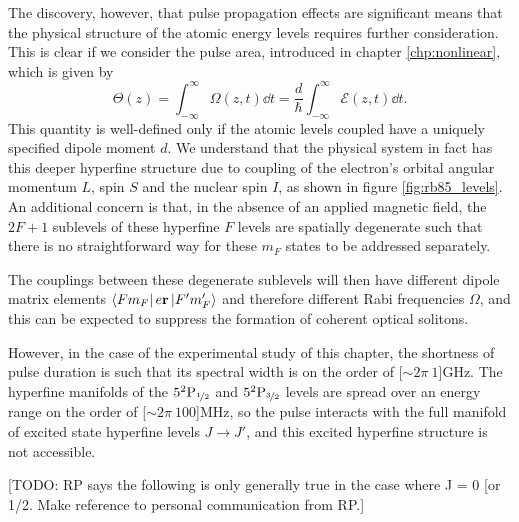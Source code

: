     The discovery, however, that pulse propagation effects are significant means
    that the physical structure of the atomic energy levels requires further
    consideration. This is clear if we consider the pulse area, introduced in
    chapter \ref{chp:nonlinear}, which is given by
    \begin{equation}
      \Theta(z) = \int^\infty_{-\infty} \Omega(z,t) \dd t
                = \frac{d}{\hbar} \int^\infty_{-\infty} \mathcal{E}(z,t) \dd t.
    \end{equation}
    This quantity is well-defined only if the atomic levels coupled have a
    uniquely specified dipole moment $d$. We understand that the physical system
    in fact has this deeper hyperfine structure due to coupling of the
    electron's orbital angular momentum $L$, spin $S$ and the nuclear spin $I$,
    as shown in figure \ref{fig:rb85_levels}. An additional concern is that, in
    the absence of an applied magnetic field, the $2F + 1$ sublevels of these
    hyperfine $F$ levels are spatially degenerate such that there is no
    straightforward way for these $m_F$ states to be addressed separately.

    The couplings between these degenerate sublevels will then have different
    dipole matrix elements $\Bra{F m_F} e \mathbf{r} \Ket{F' m'_F}$ and
    therefore different Rabi frequencies $\Omega$,  and this can be expected to
    suppress the formation of coherent optical solitons.

    However, in the case of the experimental study of this chapter, the
    shortness of pulse duration  is such that its spectral width is on the order
    of \unit[$\sim 2\pi~1$]{GHz}. The hyperfine manifolds of the
    $5^2\mathrm{P}_{\nicefrac{1}{2}}$ and $5^2\mathrm{P}_{\nicefrac{3}{2}}$
    levels are spread over an energy range on the order of \unit[$\sim
    2\pi~100$]{MHz}, so the pulse interacts with the full manifold of excited
    state hyperfine levels $J \rightarrow J'$, and this excited hyperfine
    structure is not accessible.

    [TODO: RP says the following is only generally true in the case where J = 0
    [or 1/2. Make reference to personal communication from RP.]

